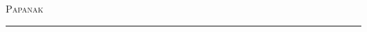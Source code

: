 \documentclass[11pt,a4paper]{article}
\newcommand{\HRule}{\rule{\linewidth}{0.5mm}}
\begin{document}
\begin{titlepage}
\begin{center}
\textsc{\LARGE Papanak}\\[1.5cm]
\HRule \\[0.5cm]
\vfill
\end{center}
\end{titlepage}
\end{document}
